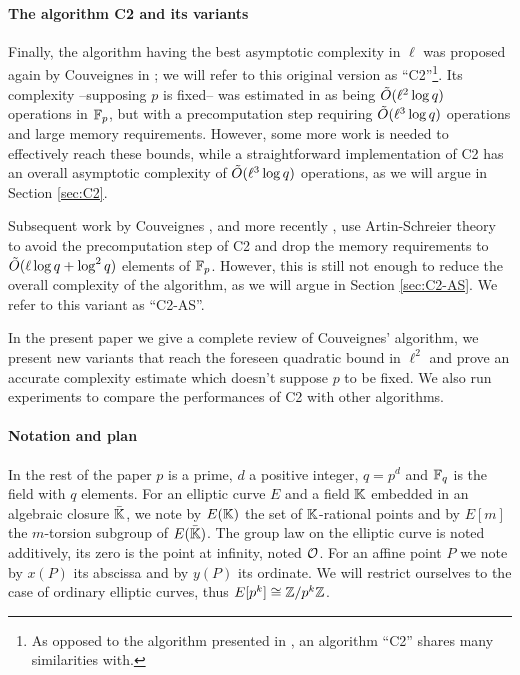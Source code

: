 \paragraph{The algorithm C2 and its variants}
Finally, the algorithm having the best asymptotic complexity in $\ell$
was proposed again by Couveignes in \cite{Cou96}; we will refer to
this original version as ``C2''\footnote{As opposed to the algorithm
  presented in \cite{Cou94}, an algorithm ``C2'' shares many
  similarities with.}. Its complexity --supposing $p$ is fixed-- was
estimated in \cite{Cou96} as being $\tilde{O}(\ell^2\log q)$ operations
in $\mathbb{F}_p$, but with a precomputation step requiring $\tilde{O}(\ell^3\log
q)$ operations and large memory requirements. However, some more work
is needed to effectively reach these bounds, while a straightforward
implementation of C2 has an overall asymptotic complexity of
$\tilde{O}(\ell^3\log q)$ operations, as we will argue in Section
\ref{sec:C2}.

Subsequent work by Couveignes \cite{Cou00}, and more recently
\cite{DFS09}, use Artin-Schreier theory to avoid the precomputation
step of C2 and drop the memory requirements to $\tilde{O}(\ell\log q +
\log^2 q)$ elements of $\mathbb{F}_p$. However, this is still not enough to
reduce the overall complexity of the algorithm, as we will argue in
Section \ref{sec:C2-AS}. We refer to this variant as ``C2-AS''.

In the present paper we give a complete review of Couveignes'
algorithm, we present new variants that reach the foreseen quadratic
bound in $\ell^2$ and prove an accurate complexity estimate which
doesn't suppose $p$ to be fixed. We also run experiments to compare
the performances of C2 with other algorithms.

\paragraph{Notation and plan}
In the rest of the paper $p$ is a prime, $d$ a positive integer,
$q=p^d$ and $\mathbb{F}_q$ is the field with $q$ elements. For an elliptic
curve $E$ and a field $\mathbb{K}$ embedded in an algebraic closure
$\bar{\mathbb{K}}$, we note by $E(\mathbb{K})$ the set of $\mathbb{K}$-rational points and by
$E[m]$ the $m$-torsion subgroup of $E(\bar{\mathbb{K}})$. The group law on
the elliptic curve is noted additively, its zero is the point at
infinity, noted $\mathcal{O}$. For an affine point $P$ we note by $x(P)$ its
abscissa and by $y(P)$ its ordinate. We will restrict ourselves to the
case of ordinary elliptic curves, thus $E[p^k]\cong\mathbb{Z}/p^k\mathbb{Z}$.

